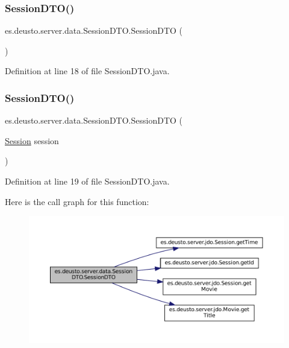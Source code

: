\subsubsection{\texorpdfstring{SessionDTO()}{SessionDTO()}\hspace{0.1cm}{\footnotesize\ttfamily [1/2]}}
{\footnotesize\ttfamily es.\+deusto.\+server.\+data.\+Session\+D\+T\+O.\+Session\+D\+TO (\begin{DoxyParamCaption}{ }\end{DoxyParamCaption})}



Definition at line 18 of file Session\+D\+T\+O.\+java.

\mbox{\label{classes_1_1deusto_1_1server_1_1data_1_1_session_d_t_o_a8bdfa9095064ac9b72508b348302c852}} 
\subsubsection{\texorpdfstring{SessionDTO()}{SessionDTO()}\hspace{0.1cm}{\footnotesize\ttfamily [2/2]}}
{\footnotesize\ttfamily es.\+deusto.\+server.\+data.\+Session\+D\+T\+O.\+Session\+D\+TO (\begin{DoxyParamCaption}\item[{\mbox{\hyperlink{classes_1_1deusto_1_1server_1_1jdo_1_1_session}{Session}}}]{session }\end{DoxyParamCaption})}



Definition at line 19 of file Session\+D\+T\+O.\+java.

Here is the call graph for this function\+:\nopagebreak
\begin{figure}[H]
\begin{center}
\leavevmode
\includegraphics[width=350pt]{classes_1_1deusto_1_1server_1_1data_1_1_session_d_t_o_a8bdfa9095064ac9b72508b348302c852_cgraph}
\end{center}
\end{figure}


